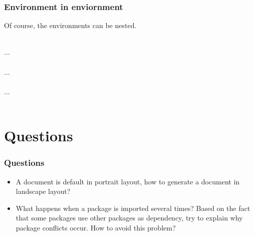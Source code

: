 \begin{frame}
	\frametitle{Environment in enviornment}
	Of course, the environments can be nested.\\
	\begin{example}
		\\
		\qquad ...\\
		\qquad{}\\
		\qquad\qquad ...\\
		\qquad{}\\
		\qquad ...\\
		\\
	\end{example}
\end{frame}

\section*{Questions}

\begin{frame}
	\frametitle{Questions}
	\begin{itemize}
		\item A document is default in portrait layout, how to generate a document in landscape layout?
		\item What happens when a package is imported several times? Based on the fact that some packages use other packages as dependency, try to explain why package conflicts occur. How to avoid this problem?

	\end{itemize}
\end{frame}
